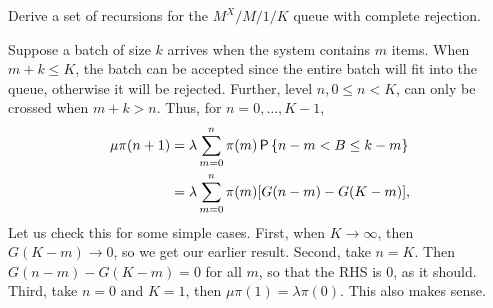 \begin{exercise}\label{ex:l-156}
 Derive a set of recursions for the $M^X/M/1/K$ queue with complete rejection.
\begin{solution}
  Suppose a batch of size $k$ arrives when the system contains $m$ items.
  When $m+k \leq K$, the batch can be accepted since the entire batch will fit into the queue, otherwise it will be rejected.
  Further, level $n, 0\leq n < K$, can only be crossed when $m+k > n$.
  Thus, for $n=0,\ldots, K-1$, 
 \begin{align*}
 \mu \pi(n+1) &= \lambda \sum_{m=0}^n \pi(m) \P{n-m < B \leq k-m} \\
&=\lambda \sum_{m=0}^n \pi(m) [G(n-m)-G(K-m)],
 \end{align*}
 Let us check this for some simple cases.
 First, when $K\to \infty$, then $G(K-m)\to 0$, so we get our earlier result.
 Second, take $n=K$.
 Then $G(n-m)-G(K-m)=0$ for all $m$, so that the RHS is 0, as it should.
 Third, take $n=0$ and $K=1$, then $\mu \pi(1)= \lambda \pi(0)$.
 This also makes sense.
\end{solution}
\end{exercise}




